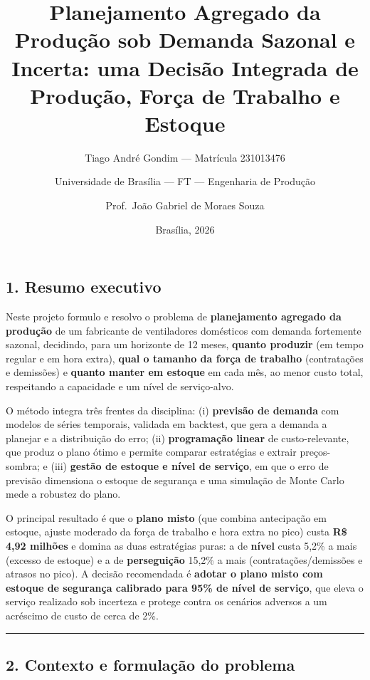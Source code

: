 \documentclass[
  brazilian,
  12pt,
]{article}
\title{Planejamento Agregado da Produção sob Demanda Sazonal e Incerta:
uma Decisão Integrada de Produção, Força de Trabalho e Estoque}
\author{Tiago André Gondim --- Matrícula 231013476 \and Universidade de
Brasília --- FT --- Engenharia de Produção \and Prof.~João Gabriel de
Moraes Souza}
\date{Brasília, 2026}
\begin{document}
\maketitle

\subsection{1. Resumo executivo}\label{resumo-executivo}

Neste projeto formulo e resolvo o problema de \textbf{planejamento
agregado da produção} de um fabricante de ventiladores domésticos com
demanda fortemente sazonal, decidindo, para um horizonte de 12 meses,
\textbf{quanto produzir} (em tempo regular e em hora extra),
\textbf{qual o tamanho da força de trabalho} (contratações e demissões)
e \textbf{quanto manter em estoque} em cada mês, ao menor custo total,
respeitando a capacidade e um nível de serviço-alvo.

O método integra três frentes da disciplina: (i) \textbf{previsão de
demanda} com modelos de séries temporais, validada em backtest, que gera
a demanda a planejar e a distribuição do erro; (ii) \textbf{programação
linear} de custo-relevante, que produz o plano ótimo e permite comparar
estratégias e extrair preços-sombra; e (iii) \textbf{gestão de estoque e
nível de serviço}, em que o erro de previsão dimensiona o estoque de
segurança e uma simulação de Monte Carlo mede a robustez do plano.

O principal resultado é que o \textbf{plano misto} (que combina
antecipação em estoque, ajuste moderado da força de trabalho e hora
extra no pico) custa \textbf{R\$ 4,92 milhões} e domina as duas
estratégias puras: a de \textbf{nível} custa 5,2\% a mais (excesso de
estoque) e a de \textbf{perseguição} 15,2\% a mais
(contratações/demissões e atrasos no pico). A decisão recomendada é
\textbf{adotar o plano misto com estoque de segurança calibrado para
95\% de nível de serviço}, que eleva o serviço realizado sob incerteza e
protege contra os cenários adversos a um acréscimo de custo de cerca de
2\%.

\begin{center}\rule{0.5\linewidth}{0.5pt}\end{center}

\subsection{2. Contexto e formulação do
problema}\label{contexto-e-formulauxe7uxe3o-do-problema}
\end{document}
